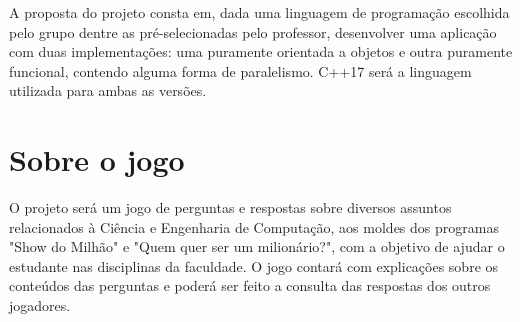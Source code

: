 \documentclass[rel_mlp]{iiufrgs}
\begin{document}


A proposta do projeto consta em, dada uma linguagem de programação escolhida pelo grupo dentre as pré-selecionadas pelo professor, desenvolver uma aplicação com duas implementações: uma puramente orientada a objetos e outra puramente funcional, contendo alguma forma de paralelismo. C++17 será a linguagem utilizada para ambas as versões.

\section{Sobre o jogo}

O projeto será um jogo de perguntas e respostas sobre diversos assuntos relacionados à Ciência e Engenharia de Computação, aos moldes dos programas "Show do Milhão" e "Quem quer ser um milionário?", com a objetivo de ajudar o estudante nas disciplinas da faculdade. O jogo contará com explicações sobre os conteúdos das perguntas e poderá ser feito a consulta das respostas dos outros jogadores. 
\end{document}
